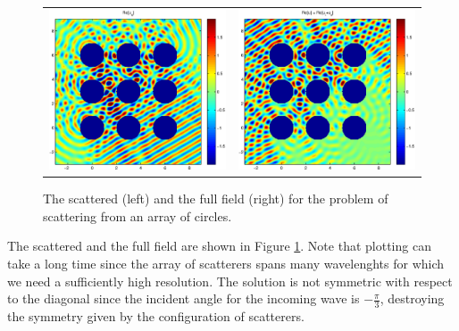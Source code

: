 \begin{figure}
\center
\begin{tabular}{cc}
\includegraphics[width=6cm]{circarrayscattered} &
\includegraphics[width=6cm]{circarrayfull}
\end{tabular}
\caption{The scattered (left) and the full field (right) for the
  problem of scattering from an array of circles.}
\label{fig:circarraysol}
\end{figure}


The scattered and the full field are shown in Figure
\ref{fig:circarraysol}. Note that plotting can take a long time since
the array of scatterers spans many wavelenghts for which we need a
sufficiently high resolution. The solution is not symmetric with
respect to the diagonal since the incident angle for the incoming wave is
$-\frac{\pi}{3}$, destroying the symmetry given by the configuration
of scatterers.














\bfi %
\efi
\bfi %
\bc{}\ec
{}
\efi

